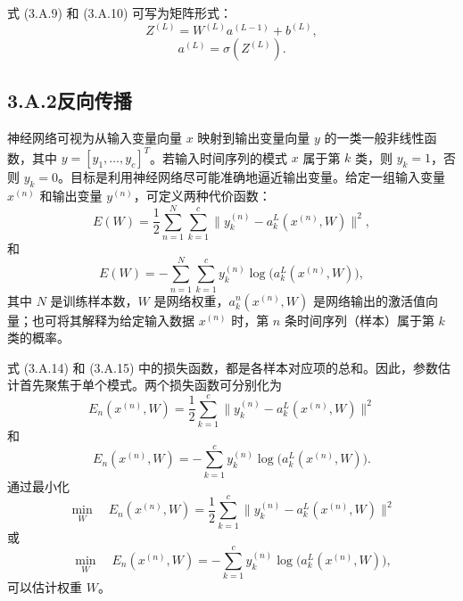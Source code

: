式 (3.A.9) 和 (3.A.10) 可写为矩阵形式：
\begin{equation}
Z^{(L)}=W^{(L)}a^{(L-1)}+b^{(L)},
\tag{3.A.12}
\end{equation}
\begin{equation}
a^{(L)}=\sigma(Z^{(L)}).
\tag{3.A.13}
\end{equation}
\FloatBarrier

\subsection*{3.A.2\quad 反向传播}

神经网络可视为从输入变量向量 $x$ 映射到输出变量向量 $y$ 的一类一般非线性函数，其中 $y=[y_1,\ldots,y_c]^T$。若输入时间序列的模式 $x$ 属于第 $k$ 类，则 $y_k=1$，否则 $y_k=0$。目标是利用神经网络尽可能准确地逼近输出变量。给定一组输入变量 $x^{(n)}$ 和输出变量 $y^{(n)}$，可定义两种代价函数：
\begin{equation}
E(W)=\frac12\sum_{n=1}^{N}\sum_{k=1}^{c}
\lVert y_k^{(n)}-a_k^L(x^{(n)},W)\rVert^2,
\tag{3.A.14}
\end{equation}
和
\begin{equation}
E(W)=-\sum_{n=1}^{N}\sum_{k=1}^{c}y_k^{(n)}\log\bigl(a_k^L(x^{(n)},W)\bigr),
\tag{3.A.15}
\end{equation}
其中 $N$ 是训练样本数，$W$ 是网络权重，$a_k^n(x^{(n)},W)$ 是网络输出的激活值向量；也可将其解释为给定输入数据 $x^{(n)}$ 时，第 $n$ 条时间序列（样本）属于第 $k$ 类的概率。

式 (3.A.14) 和 (3.A.15) 中的损失函数，都是各样本对应项的总和。因此，参数估计首先聚焦于单个模式。两个损失函数可分别化为
\begin{equation}
E_n(x^{(n)},W)=\frac12\sum_{k=1}^{c}
\lVert y_k^{(n)}-a_k^L(x^{(n)},W)\rVert^2
\tag{3.A.16}
\end{equation}
和
\begin{equation}
E_n(x^{(n)},W)=-\sum_{k=1}^{c}y_k^{(n)}\log\bigl(a_k^L(x^{(n)},W)\bigr).
\tag{3.A.17}
\end{equation}
通过最小化
\begin{equation}
\min_W\quad E_n(x^{(n)},W)=\frac12\sum_{k=1}^{c}
\lVert y_k^{(n)}-a_k^L(x^{(n)},W)\rVert^2
\tag{3.A.18}
\end{equation}
或
\begin{equation}
\min_W\quad E_n(x^{(n)},W)=-\sum_{k=1}^{c}y_k^{(n)}\log\bigl(a_k^L(x^{(n)},W)\bigr),
\tag{3.A.19}
\end{equation}
可以估计权重 $W$。

